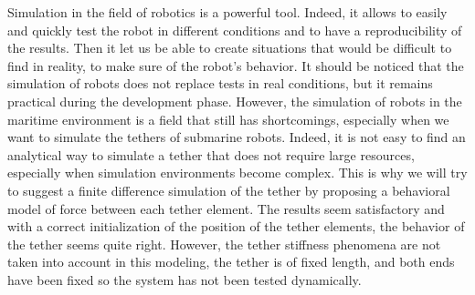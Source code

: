 Simulation in the field of robotics is a powerful tool. Indeed, it allows to easily and quickly test the robot in different conditions and to have a reproducibility of the results. Then it let us be able to create situations that would be difficult to find in reality, to make sure of the robot's behavior. It should be noticed that the simulation of robots does not replace tests in real conditions, but it remains practical during the development phase. However, the simulation of robots in the maritime environment is a field that still has shortcomings, especially when we want to simulate the tethers of submarine robots. Indeed, it is not easy to find an analytical way to simulate a tether that does not require large resources, especially when simulation environments become complex. This is why we will try to suggest a finite difference simulation of the tether by proposing a behavioral model of force between each tether element. The results seem satisfactory and with a correct initialization of the position of the tether elements, the behavior of the tether seems quite right. However, the tether stiffness phenomena are not taken into account in this modeling, the tether is of fixed length, and both ends have been fixed so the system has not been tested dynamically.